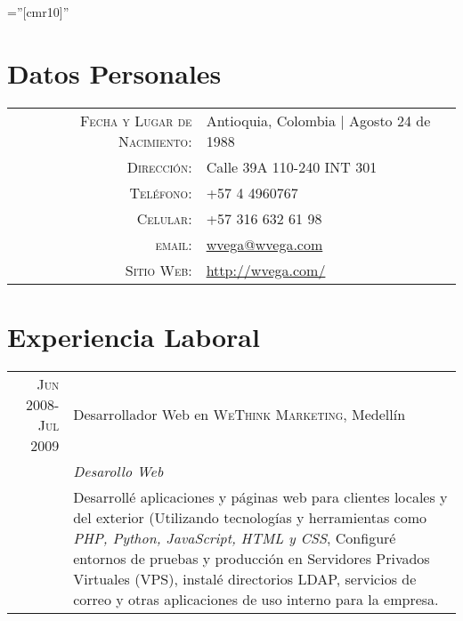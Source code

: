 \documentclass[letter,10pt]{article}
\begin{document}
\pagestyle{empty} %

\font\fb=''[cmr10]'' %

\par{\par}
\par{\bigskip\par}

\section{Datos Personales}
\begin{tabular}{rl}
    \textsc{Fecha y Lugar de Nacimiento:} & Antioquia, Colombia  | Agosto 24 de 1988 \\
    \textsc{Dirección:}   & Calle 39A 110-240 INT 301\\
    \textsc{Teléfono:}     & +57 4 4960767\\
    \textsc{Celular:} & +57 316 632 61 98\\
    \textsc{email:}     & \href{mailto:wvega@wvega.com}{wvega@wvega.com}\\
    \textsc{Sitio Web:}  & \href{http://wvega.com/}{http://wvega.com/}
\end{tabular}

\section{Experiencia Laboral}
\begin{tabular}{r|p{11cm}}
    \textsc{Jun 2008-Jul 2009} & Desarrollador Web en \textsc{WeThink Marketing}, Medellín \\&\emph{Desarollo Web}\\&\footnotesize{Desarrollé aplicaciones y páginas web para clientes locales y del exterior (Utilizando tecnologías y herramientas como \textit{PHP, Python, JavaScript, HTML y CSS}, Configuré entornos de pruebas y producción en Servidores Privados Virtuales (VPS), instalé directorios LDAP, servicios de correo y otras aplicaciones de uso interno para la empresa.}%
\end{tabular}
\end{document}
